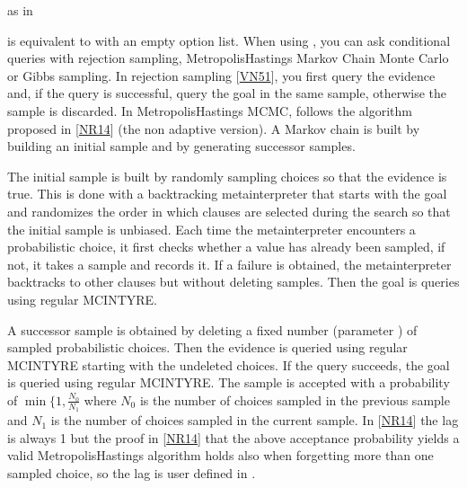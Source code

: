 \documentclass[letterpaper,10pt,english]{sphinxmanual}
\begin{document}
\sphinxAtStartPar
as in

\begin{sphinxVerbatim}[commandchars=\\\{\}]
 \PYG{p}{[}
\end{sphinxVerbatim}

\sphinxAtStartPar
{} is equivalent to  with an empty option list.
When using , you can ask conditional queries with rejection sampling,
Metropolis\sphinxhyphen{}Hastings Markov Chain Monte Carlo or Gibbs sampling.
In rejection sampling {[}\hyperlink{cite.index:id59}{VN51}{]}, you first query the evidence and, if the query is successful, query the goal in the same sample, otherwise the sample is discarded.
In Metropolis\sphinxhyphen{}Hastings MCMC,  follows the algorithm proposed in {[}\hyperlink{cite.index:id60}{NR14}{]} (the non adaptive version).
A Markov chain is built by building an initial sample and by generating successor samples.

\sphinxAtStartPar
The initial sample is built by randomly sampling choices so that the evidence is true.
This is done with a backtracking meta\sphinxhyphen{}interpreter that starts with the goal and randomizes the order in which clauses are selected during the search so that the initial sample is unbiased.
Each time the meta\sphinxhyphen{}interpreter encounters a probabilistic choice, it first checks whether a value has already been sampled, if not, it takes a sample and records it.
If a failure is obtained, the meta\sphinxhyphen{}interpreter backtracks to other clauses but without deleting samples. Then the goal is queries using regular MCINTYRE.

\sphinxAtStartPar
A successor sample is obtained by deleting a fixed number (parameter ) of sampled probabilistic choices.
Then the evidence is queried using regular MCINTYRE starting with the undeleted choices.
If the query succeeds, the goal is queried using regular MCINTYRE.
The sample is accepted with a probability of \(\min\{1,\frac{N_0}{N_1}\) where \(N_0\) is the number of choices sampled in the previous sample and \(N_1\) is the number of choices sampled in the current sample.
In {[}\hyperlink{cite.index:id60}{NR14}{]} the lag is always 1 but the proof in {[}\hyperlink{cite.index:id60}{NR14}{]} that the above acceptance probability yields a valid Metropolis\sphinxhyphen{}Hastings algorithm holds also when forgetting more than one sampled choice, so the lag is user defined in .
\end{document}

